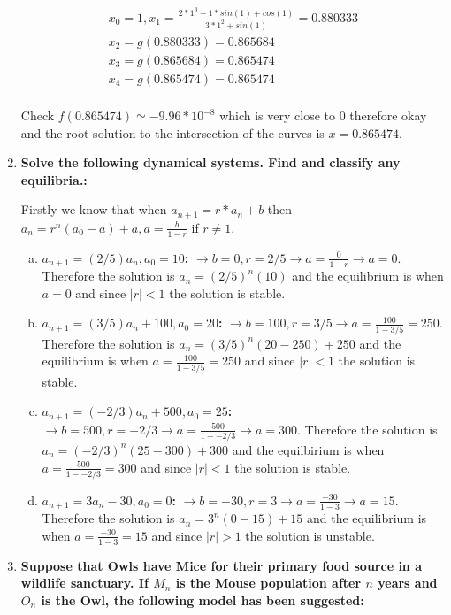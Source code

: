 \documentclass{article}
\begin{document}
\begin{enumerate}[1.]
\begin{gather*}
x_0 = 1, x_1 = \frac{2* 1^3 + 1 * sin(1) + cos(1)}{3 * 1^2 + sin(1)} = 0.880333 \\
x_2 = g(0.880333) = 0.865684 \\
x_3 = g(0.865684) = 0.865474 \\
x_4 = g(0.865474) = 0.865474 \\
\end{gather*}

Check $f(0.865474) \simeq -9.96 * 10^{-8}$ which is very close to 0 therefore okay and the root solution to the intersection of the curves is $x = 0.865474$.

\item
\textbf{Solve the following dynamical systems. Find and classify any equilibria.:}

Firstly we know that when $a_{n+1} = r*a_n + b$ then $a_n = r^n(a_0 - a) + a, a = \frac{b}{1-r}$ if $r \neq 1$.

\begin{enumerate}[(a)]
  \item \textbf{$a_{n+1} = (2/5)a_n, a_0 = 10$:} 
$\to b = 0, r=2/5 \to a = \frac{0}{1 - r} \to a = 0$. Therefore the solution is $a_n = (2/5)^n(10)$ and the equilibrium is when $a = 0$ and since $|r| < 1$ the solution is stable.

  \item \textbf{$a_{n+1} = (3/5)a_n + 100, a_0 = 20$:}
$\to b = 100, r = 3/5 \to a = \frac{100}{1 - 3/5} = 250$. Therefore the solution is $a_n = (3/5)^n(20 - 250) + 250$ and the equilibrium is when $a = \frac{100}{1 - 3/5} = 250$ and since $|r| < 1$ the solution is stable.

  \item \textbf{$a_{n+1} = (-2/3)a_n + 500, a_0 = 25$:} 
$\to b = 500, r=-2/3 \to a = \frac{500}{1 - -2/3} \to a = 300$. 
Therefore the solution is $a_n = (-2/3)^n(25 - 300) + 300$ and the equilbirium is when $a = \frac{500}{1 - -2/3} = 300$ and since $|r| < 1$ the solution is stable.

  \item \textbf{$a_{n+1} = 3a_n - 30, a_0 = 0$:} 
$\to b = -30, r=3 \to a = \frac{-30}{1 - 3} \to a = 15$. Therefore the solution is $a_n = 3^n(0 - 15) + 15$ and the equilibrium is when $a = \frac{-30}{1-3} = 15$ and since $|r| > 1$ the solution is unstable.
\end{enumerate}

\item 
\textbf{Suppose that Owls have Mice for their primary food source in a wildlife sanctuary. If $M_n$ is the Mouse population after $n$ years and $O_n$ is the Owl, the following model has been suggested:}


\end{enumerate}
\end{document}
